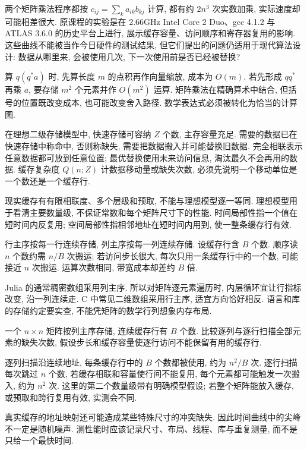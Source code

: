 \label{ch:performance}
两个矩阵乘法程序都按 $c_{ij}=\sum_k a_{ik}b_{kj}$ 计算, 都有约 $2n^3$ 次实数加乘, 实际速度却可能相差很大. 原课程的实验是在 2.66GHz Intel Core 2 Duo、gcc 4.1.2 与 ATLAS 3.6.0 的历史平台上进行, 展示缓存容量、访问顺序和寄存器复用的影响. 这些曲线不能被当作今日硬件的测试结果, 但它们提出的问题仍适用于现代算法设计: 数据从哪里来, 会被使用几次, 下一次使用前是否已经被替换?

算 $q(q^*a)$ 时, 先算长度 $m$ 的点积再作向量缩放, 成本为 $O(m)$. 若先形成 $qq^*$ 再乘 $a$, 要存储 $m^2$ 个元素并作 $O(m^2)$ 运算. 矩阵乘法在精确算术中结合, 但括号的位置既改变成本, 也可能改变舍入路径. 数学表达式必须被转化为恰当的计算图.

\begin{definition}
在理想二级存储模型中, 快速存储可容纳 $Z$ 个数, 主存容量充足. 需要的数据已在快速存储中称命中, 否则称缺失, 需要把数据搬入并可能替换旧数据. 完全相联表示任意数据都可放到任意位置; 最优替换使用未来访问信息, 淘汰最久不会再用的数据. 缓存复杂度 $Q(n;Z)$ 计数据移动量或缺失次数, 必须先说明一个移动单位是一个数还是一个缓存行.
\end{definition}
现实缓存有有限相联度、多个层级和预取, 不能与理想模型逐一等同. 理想模型用于看清主要数量级, 不保证常数和每个矩阵尺寸下的性能. 时间局部性指一个值在短时间内反复用; 空间局部性指相邻地址在短时间内用到, 使一整条缓存行有效.

行主序按每一行连续存储, 列主序按每一列连续存储. 设缓存行含 $B$ 个数. 顺序读 $n$ 个数约需 $n/B$ 次搬运; 若访问步长很大, 每次只用一条缓存行中的一个数, 可能接近 $n$ 次搬运. 运算次数相同, 带宽成本却差约 $B$ 倍.

Julia 的通常稠密数组采用列主序. 所以对矩阵逐元素遍历时, 内层循环宜让行指标改变, 沿一列连续走. C 中常见二维数组采用行主序, 适宜方向恰好相反. 语言和库的存储约定要实查, 不能凭矩阵的数学行列想象内存布局.

\begin{example}
一个 $n\times n$ 矩阵按列主序存储, 连续缓存行有 $B$ 个数. 比较逐列与逐行扫描全部元素的缺失次数, 假设步长和缓存容量使逐行访问不能保留有用的缓存行.
\end{example}
\begin{solution}
逐列扫描沿连续地址, 每条缓存行中的 $B$ 个数都被使用, 约为 $n^2/B$ 次. 逐行扫描每次跳过 $n$ 个数, 若缓存相联和容量使行间不能复用, 每个元素都可能触发一次搬入, 约为 $n^2$ 次. 这里的第二个数量级带有明确模型假设; 若整个矩阵能放入缓存, 或预取和跨行复用有效, 实测会不同.
\end{solution}
真实缓存的地址映射还可能造成某些特殊尺寸的冲突缺失. 因此时间曲线中的尖峰不一定是随机噪声. 测性能时应该记录尺寸、布局、线程、库与重复测量, 而不是只给一个最快时间.

